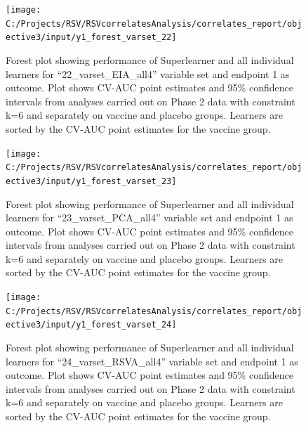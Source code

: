 \documentclass[11pt]{article}
\begin{document}
\begin{figure}[H]

{\centering \texttt{[image: C:/Projects/RSV/RSVcorrelatesAnalysis/correlates\_report/objective3/input/y1\_forest\_varset\_22]} 

}

\caption[Forest plot for ``22\_varset\_EIA\_all4'' variable set, endpoint 1.]{Forest plot showing performance of Superlearner and all individual learners for ``22\_varset\_EIA\_all4'' variable set and endpoint 1 as outcome. Plot shows CV-AUC point estimates and 95\% confidence intervals from analyses carried out on Phase 2 data with constraint k=6 and separately on vaccine and placebo groups. Learners are sorted by the CV-AUC point estimates for the vaccine group.}\label{fig:y1-forest-varset-22}
\end{figure}

\begin{figure}[H]

{\centering \texttt{[image: C:/Projects/RSV/RSVcorrelatesAnalysis/correlates\_report/objective3/input/y1\_forest\_varset\_23]} 

}

\caption[Forest plot for ``23\_varset\_PCA\_all4'' variable set, endpoint 1.]{Forest plot showing performance of Superlearner and all individual learners for ``23\_varset\_PCA\_all4'' variable set and endpoint 1 as outcome. Plot shows CV-AUC point estimates and 95\% confidence intervals from analyses carried out on Phase 2 data with constraint k=6 and separately on vaccine and placebo groups. Learners are sorted by the CV-AUC point estimates for the vaccine group.}\label{fig:y1-forest-varset-23}
\end{figure}

\begin{figure}[H]

{\centering \texttt{[image: C:/Projects/RSV/RSVcorrelatesAnalysis/correlates\_report/objective3/input/y1\_forest\_varset\_24]} 

}

\caption[Forest plot for ``24\_varset\_RSVA\_all4'' variable set, endpoint 1.]{Forest plot showing performance of Superlearner and all individual learners for ``24\_varset\_RSVA\_all4'' variable set and endpoint 1 as outcome. Plot shows CV-AUC point estimates and 95\% confidence intervals from analyses carried out on Phase 2 data with constraint k=6 and separately on vaccine and placebo groups. Learners are sorted by the CV-AUC point estimates for the vaccine group.}\label{fig:y1-forest-varset-24}
\end{figure}
\end{document}
